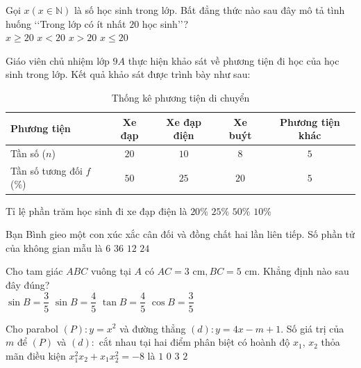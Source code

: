 \begin{ex}%
Gọi $x\left(x\in\mathbb{N}\right)$ là số học sinh trong lớp. Bất đẳng thức nào sau đây mô tả tình huống \lq\lq Trong lớp có ít nhất $20$ học sinh\rq\rq? \\
\choice
{\True $x\ge 20$}
{$x<20$}
{$x>20$}
{$x\le 20$}
\end{ex}

\begin{ex}%
Giáo viên chủ nhiệm lớp $9A$ thực hiện khảo sát về phương tiện đi học của học sinh trong lớp. Kết quả khảo sát được trình bày như sau:
\begin{table}[h!]
\centering
\caption{Thống kê phương tiện di chuyển}
\renewcommand{\arraystretch}{1.2}
\begin{tabular}{|l|c|c|c|c|}
\hline
\textbf{Phương tiện} & \textbf{Xe đạp} & \textbf{Xe đạp điện} & \textbf{Xe buýt} & \textbf{Phương tiện khác} \\
\hline
Tần số ($n$) & $20$ & $10$ & $8$ & $5$ \\
\hline
Tần số tương đối $f$ (\%) & $50$ & $25$ & $20$ & $5$ \\
\hline
\end{tabular}
\end{table}
Tỉ lệ phần trăm học sinh đi xe đạp điện là
\choice
{$20\%$}
{\True $25\%$}
{$50\%$}
{$10\%$}
\end{ex}

\begin{ex}%
Bạn Bình gieo một con xúc xắc cân đối và đồng chất hai lần liên tiếp. Số phần tử của không gian mẫu là
\choice
{$6$}
{\True $36$}
{$12$}
{$24$}
\end{ex}

\begin{ex}%
Cho tam giác $ABC$ vuông tại $A$ có $AC=3\text{ cm}, BC=5\text{ cm}$. Khẳng định nào sau đây đúng? \\
\choice
{\True $\sin B=\dfrac{3}{5}$}
{$\sin B=\dfrac{4}{5}$}
{$\tan B=\dfrac{4}{5}$}
{$\cos B=\dfrac{3}{5}$}
\end{ex}

\begin{ex}%
Cho parabol $\left(P\right)\colon y=x^2$ và đường thẳng $(d)\colon y=4x-m+1$. Số giá trị của $m$ để $\left(P\right)$ và $(d)\colon$ cắt nhau tại hai điểm phân biệt có hoành độ $x_1$, $x_2$ thỏa mãn điều kiện $x_1^2x_2+x_1x_2^2=-8$ là
\choice
{\True $1$}
{$0$}
{$3$}
{$2$}
\end{ex}

